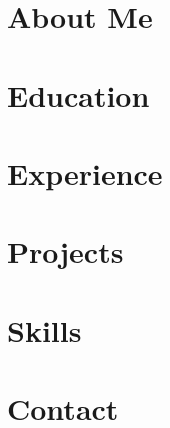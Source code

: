 \documentclass[12pt, letterpaper, titlepage]{article}
\begin{document}
{\centering {\scshape\LARGE \name\ \par}}

\section{About Me}
\begin{aboutme}\end{aboutme}

\section{Education}
\begin{education}\end{education}

\section{Experience}
\begin{experience}\end{experience}

\section{Projects}
\begin{projects}\end{projects}

\section{Skills}
\begin{skills}\end{skills}

\section{Contact}
\begin{contact}\end{contact}
\end{document}
